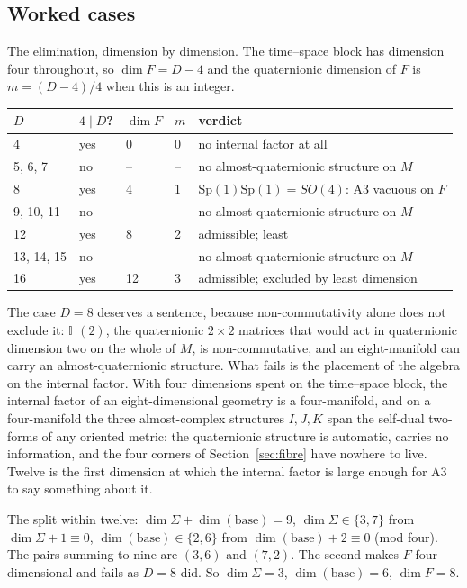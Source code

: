 \documentclass[11pt,a4paper]{article}
\theoremstyle{plain}
\theoremstyle{definition}
\theoremstyle{remark}
\newcommand{\Hquat}{\mathbb{H}}
\begin{document}
\subsection{Worked cases}\label{sec:dim-worked}

The elimination, dimension by dimension. The time--space block has dimension four throughout, so $\dim F=D-4$ and the quaternionic dimension of $F$ is $m=(D-4)/4$ when this is an integer.

\begin{center}
\begin{tabular}{lllll}
\toprule
$D$ & $4\mid D$? & $\dim F$ & $m$ & verdict\\
\midrule
4 & yes & 0 & 0 & no internal factor at all\\
5, 6, 7 & no & -- & -- & no almost-quaternionic structure on $M$\\
8 & yes & 4 & 1 & $\mathrm{Sp}(1)\mathrm{Sp}(1)=SO(4)$: A3 vacuous on $F$\\
9, 10, 11 & no & -- & -- & no almost-quaternionic structure on $M$\\
12 & yes & 8 & 2 & admissible; least\\
13, 14, 15 & no & -- & -- & no almost-quaternionic structure on $M$\\
16 & yes & 12 & 3 & admissible; excluded by least dimension\\
\bottomrule
\end{tabular}
\end{center}

The case $D=8$ deserves a sentence, because non-commutativity alone does not exclude it: $\Hquat(2)$, the quaternionic $2\times2$ matrices that would act in quaternionic dimension two on the whole of $M$, is non-commutative, and an eight-manifold can carry an almost-quaternionic structure. What fails is the placement of the algebra on the internal factor. With four dimensions spent on the time--space block, the internal factor of an eight-dimensional geometry is a four-manifold, and on a four-manifold the three almost-complex structures $I,J,K$ span the self-dual two-forms of any oriented metric: the quaternionic structure is automatic, carries no information, and the four corners of Section~\ref{sec:fibre} have nowhere to live. Twelve is the first dimension at which the internal factor is large enough for A3 to say something about it.

The split within twelve: $\dim\Sigma+\dim(\text{base})=9$, $\dim\Sigma\in\{3,7\}$ from $\dim\Sigma+1\equiv0$, $\dim(\text{base})\in\{2,6\}$ from $\dim(\text{base})+2\equiv0$ (mod four). The pairs summing to nine are $(3,6)$ and $(7,2)$. The second makes $F$ four-dimensional and fails as $D=8$ did. So $\dim\Sigma=3$, $\dim(\text{base})=6$, $\dim F=8$.
\end{document}
